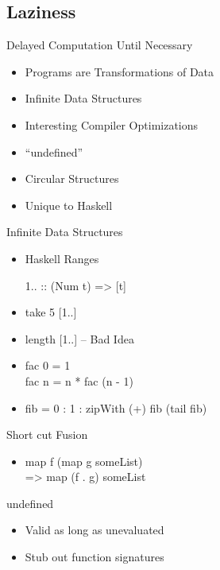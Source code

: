 \documentclass{beamer}                  %
\newcommand{\srule}{
	\rule{\textwidth}{1pt}\\
}
\newlength{\subsecwidth}
\newenvironment{slide}{
	\begin{frame} %
	\settowidth{\subsecwidth}{\insertsubsection} %
	\ifthenelse{\dimtest{\subsecwidth}{<}{1pt}}{ %
		\frametitle{\insertsection\\             %
		\vspace{-1ex}                            %
		\color{fore}\srule                       %
		\par                                     %
		\vspace{-3ex}                            %
		}
	}{                                           %
		\frametitle{\insertsection\ -- \insertsubsection\\ %
		\vspace{-1ex}                            %
		\color{fore}\srule                       %
		\par                                     %
		\vspace{-3ex}                            %
		}
	}
	\Large                                       %
}{
	\end{frame}
}
\begin{document}
\subsection{Laziness}

\begin{slide}
  Delayed Computation Until Necessary
  \begin{itemize}
    \item Programs are Transformations of Data
    \item Infinite Data Structures
    \item Interesting Compiler Optimizations
    \item ``undefined''
    \item Circular Structures
    \item Unique to Haskell
  \end{itemize}
\end{slide}

\begin{slide}
  Infinite Data Structures
  \begin{itemize}
    \item Haskell Ranges
    \item  [1..] :: (Num t) => [t]
    \item take 5 [1..]
    \item length [1..] -- Bad Idea
    \item fac 0 = 1\\
      fac n = n * fac (n - 1)
    \item fib = 0 : 1 : zipWith (+) fib (tail fib)
  \end{itemize}
\end{slide}

\begin{slide}
  Short cut Fusion
  \begin{itemize}
    \item map f (map g someList)\\
      => map (f . g) someList
  \end{itemize}
\end{slide}

\begin{slide}
  undefined
  \begin{itemize}
    \item Valid as long as unevaluated
    \item Stub out function signatures
  \end{itemize}
\end{slide}
\end{document}
